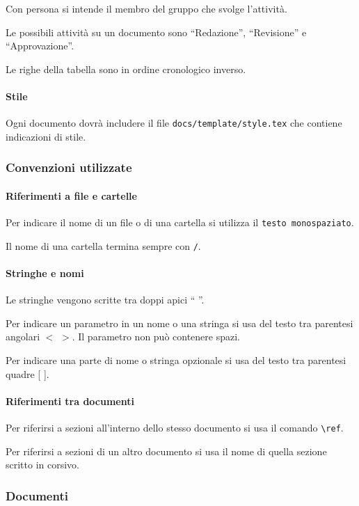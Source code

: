 \documentclass[a4paper, 12pt]{article}
\begin{document}
Con persona si intende il membro del gruppo che svolge l'attività.

Le possibili attività su un documento sono ``Redazione'', ``Revisione'' e ``Approvazione''.

Le righe della tabella sono in ordine cronologico inverso.

\paragraph{Stile}
Ogni documento dovrà includere il file \texttt{docs/template/style.tex} che contiene indicazioni di stile.



\subsubsection{Convenzioni utilizzate}
\paragraph{Riferimenti a file e cartelle}
Per indicare il nome di un file o di una cartella si utilizza il  \texttt{testo monospaziato}.

Il nome di una cartella termina sempre con \texttt{/}.

\paragraph{Stringhe e nomi}
Le stringhe vengono scritte tra doppi apici `` ''.

Per indicare un parametro in un nome o una stringa si usa del testo tra parentesi angolari $<$ $>$. Il parametro non può contenere spazi.

Per indicare una parte di nome o stringa opzionale si usa del testo tra parentesi quadre [ ].

\paragraph{Riferimenti tra documenti}
Per riferirsi a sezioni all'interno dello stesso documento si usa il comando \verb-\ref-.

Per riferirsi a sezioni di un altro documento si usa il nome di quella sezione scritto in corsivo.

\subsubsection{Documenti}\label{documentazione-documenti}
\end{document}
